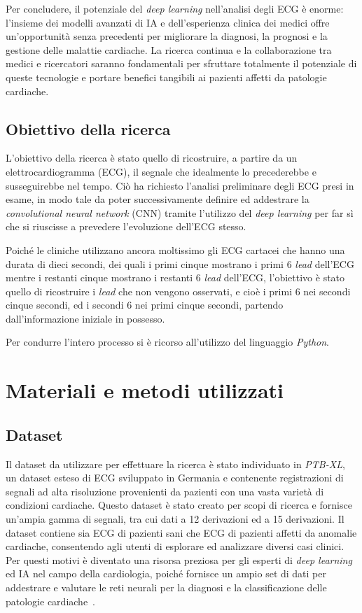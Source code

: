 \documentclass[12pt,italian]{report}
\begin{document}
Per concludere, il potenziale del \textit{deep learning} nell'analisi degli ECG è enorme: l'insieme dei modelli avanzati di IA e dell'esperienza clinica dei medici offre un'opportunità senza precedenti per migliorare la diagnosi, la prognosi e la gestione delle malattie cardiache. La ricerca continua e la collaborazione tra medici e ricercatori saranno fondamentali per sfruttare totalmente il potenziale di queste tecnologie e portare benefici tangibili ai pazienti affetti da patologie cardiache.

\section{Obiettivo della ricerca}
\label{sec:obiettivo}

L'obiettivo della ricerca è stato quello di ricostruire, a partire da un elettrocardiogramma (ECG), il segnale che idealmente lo precederebbe e susseguirebbe nel tempo. Ciò ha richiesto l'analisi preliminare degli ECG presi in esame, in modo tale da poter successivamente definire ed addestrare la \textit{convolutional neural network} (CNN) tramite l'utilizzo del \textit{deep learning} per far sì che si riuscisse a prevedere l'evoluzione dell'ECG stesso.

Poiché le cliniche utilizzano ancora moltissimo gli ECG cartacei che hanno una durata di dieci secondi, dei quali i primi cinque mostrano i primi 6 \textit{lead} dell'ECG mentre i restanti cinque mostrano i restanti 6 \textit{lead} dell'ECG, l'obiettivo è stato quello di ricostruire i \textit{lead} che non vengono osservati, e cioè i primi 6 nei secondi cinque secondi, ed i secondi 6 nei primi cinque secondi, partendo dall'informazione iniziale in possesso.

Per condurre l'intero processo si è ricorso all'utilizzo del linguaggio \textit{Python}.

\chapter{Materiali e metodi utilizzati}
\label{chap:materiali}

\section{Dataset}
\label{sec:dataset}

Il dataset da utilizzare per effettuare la ricerca è stato individuato in \textit{PTB-XL}, un dataset esteso di ECG sviluppato in Germania e contenente registrazioni di segnali ad alta risoluzione provenienti da pazienti con una vasta varietà di condizioni cardiache. Questo dataset è stato creato per scopi di ricerca e fornisce un'ampia gamma di segnali, tra cui dati a 12 derivazioni ed a 15 derivazioni. Il dataset contiene sia ECG di pazienti sani che ECG di pazienti affetti da anomalie cardiache, consentendo agli utenti di esplorare ed analizzare diversi casi clinici. Per questi motivi è diventato una risorsa preziosa per gli esperti di \textit{deep learning} ed IA nel campo della cardiologia, poiché fornisce un ampio set di dati per addestrare e valutare le reti neurali per la diagnosi e la classificazione delle patologie cardiache~\cite{datasetdistro}.
\end{document}
